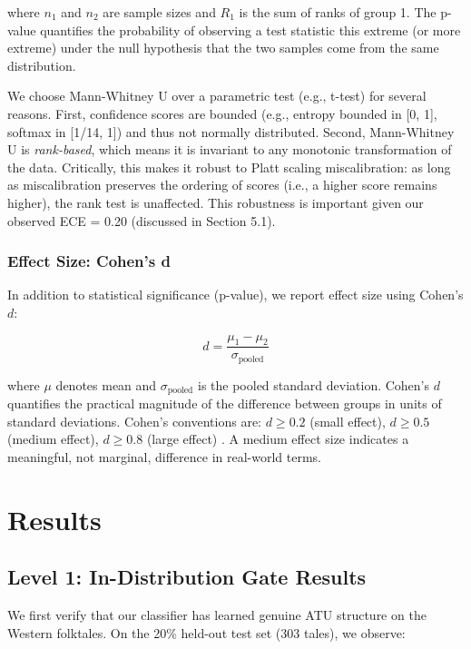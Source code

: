\documentclass{article}
\begin{document}
where $n_1$ and $n_2$ are sample sizes and $R_1$ is the sum of ranks of group 1. The p-value quantifies the probability of observing a test statistic this extreme (or more extreme) under the null hypothesis that the two samples come from the same distribution.

We choose Mann-Whitney U over a parametric test (e.g., t-test) for several reasons. First, confidence scores are bounded (e.g., entropy bounded in [0, 1], softmax in [1/14, 1]) and thus not normally distributed. Second, Mann-Whitney U is \textit{rank-based}, which means it is invariant to any monotonic transformation of the data. Critically, this makes it robust to Platt scaling miscalibration: as long as miscalibration preserves the ordering of scores (i.e., a higher score remains higher), the rank test is unaffected. This robustness is important given our observed ECE = 0.20 (discussed in Section 5.1).

\subsubsection{Effect Size: Cohen's d}

In addition to statistical significance (p-value), we report effect size using Cohen's $d$:

\begin{equation}
d = \frac{\mu_1 - \mu_2}{\sigma_{\text{pooled}}}
\end{equation}

where $\mu$ denotes mean and $\sigma_{\text{pooled}}$ is the pooled standard deviation. Cohen's $d$ quantifies the practical magnitude of the difference between groups in units of standard deviations. Cohen's conventions are: $d \geq 0.2$ (small effect), $d \geq 0.5$ (medium effect), $d \geq 0.8$ (large effect) \citep{cohen1988}. A medium effect size indicates a meaningful, not marginal, difference in real-world terms.

\section{Results}

\subsection{Level 1: In-Distribution Gate Results}

We first verify that our classifier has learned genuine ATU structure on the Western folktales. On the 20\% held-out test set (303 tales), we observe:
\end{document}
